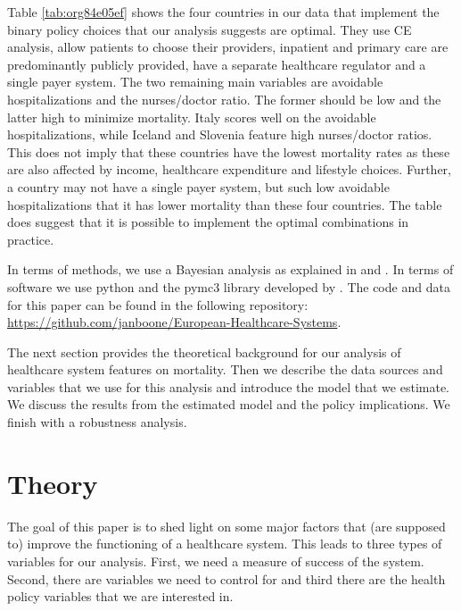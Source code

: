 \documentclass{article}
\begin{document}
Table \ref{tab:org84e05ef} shows the four countries in our data that implement the binary policy choices that our analysis suggests are optimal. They use CE analysis, allow patients to choose their providers, inpatient and primary care are predominantly publicly provided, have a separate healthcare regulator and a single payer system. The two remaining main variables are avoidable hospitalizations and the nurses/doctor ratio. The former should be low and the latter high to minimize mortality. Italy scores well on the avoidable hospitalizations, while Iceland and Slovenia feature high nurses/doctor ratios. This does not imply that these countries have the lowest mortality rates as these are also affected by income, healthcare expenditure and lifestyle choices. Further, a country may not have a single payer system, but such low avoidable hospitalizations that it has lower mortality than these four countries. The table does suggest that it is possible to implement the optimal combinations in practice.

In terms of methods, we use a Bayesian analysis as explained in \cite{mcelreath} and \cite{GelmanBook}. In terms of software we use python and the pymc3 library developed by \cite{pymc3}. The code and data for this paper can be found in the following repository: \url{https://github.com/janboone/European-Healthcare-Systems}.

The next section provides the theoretical background for our analysis of healthcare system features on mortality. Then we describe the data sources and variables that we use for this analysis and introduce the model that we estimate. We discuss the results from the estimated model and the policy implications. We finish with a robustness analysis.



\section{Theory}
\label{sec:orgc882928}
\label{sec:theory}

The goal of this paper is to shed light on some major factors that (are supposed to) improve the functioning of a healthcare system. This leads to three types of variables for our analysis. First, we need a measure of success of the system. Second, there are variables we need to control for and third there are the health policy variables that we are interested in.
\end{document}
